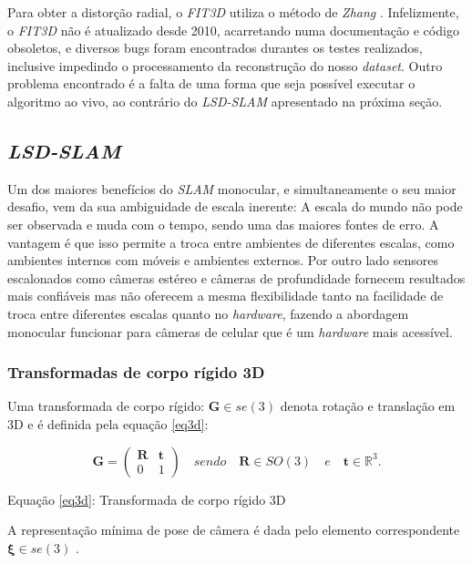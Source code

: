 Para obter a distorção radial, o \textit{FIT3D} utiliza o método de \textit{Zhang} \cite{FIT3D}. Infelizmente, o \textit{FIT3D} não é atualizado desde 2010, acarretando numa documentação e código obsoletos, e diversos bugs foram encontrados durantes os testes realizados, inclusive impedindo o processamento da reconstrução do nosso \textit{dataset}. Outro problema encontrado é a falta de uma forma que seja possível executar o algoritmo ao vivo, ao contrário do \textit{LSD-SLAM} apresentado na próxima seção.

\subsection{\textit{LSD-SLAM}}

Um dos maiores benefícios do \textit{SLAM} monocular, e simultaneamente o seu maior desafio, vem da sua ambiguidade de escala inerente: A escala do mundo não pode ser observada e muda com o tempo, sendo uma das maiores fontes de erro. A vantagem é que isso permite a troca entre ambientes de diferentes escalas, como ambientes internos com móveis e ambientes externos. Por outro lado sensores escalonados como câmeras estéreo e câmeras de profundidade fornecem resultados mais confiáveis mas não oferecem a mesma flexibilidade tanto na facilidade de troca entre diferentes escalas quanto no \textit{hardware}, fazendo a abordagem monocular funcionar para câmeras de celular que é um \textit{hardware} mais acessível. 

\subsubsection{Transformadas de corpo rígido 3D}

Uma transformada de corpo rígido: $\mathbf{G} \in se(3)$ denota rotação e translação em 3D e é definida pela equação \eqref{eq3d}: 

\begin{equation}\label{eq3d}
	\mathbf{G} = \begin{pmatrix}
	\mathbf{R} & \mathbf{t} \\
	0 & 1\end{pmatrix}
\quad sendo \quad \mathbf{R} \in SO(3) \quad e \quad \mathbf{t} \in \mathbb{R}^3.
\end{equation}

Equação \eqref{eq3d}: Transformada de corpo rígido 3D

A representação mínima de pose de câmera é dada pelo elemento correspondente $\mathbf{\xi} \in se(3)$ \cite[p. 4]{LSD-SLAM-Artigo}.

